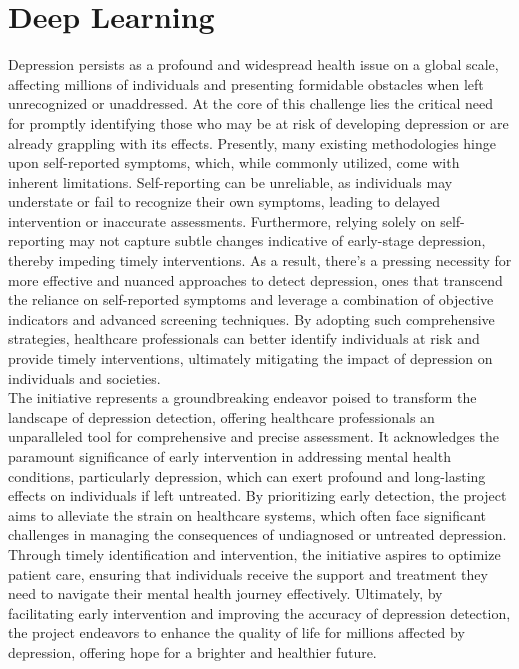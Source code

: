 \section{Deep Learning}
Depression persists as a profound and widespread health issue on a global scale, affecting millions of individuals and presenting formidable obstacles when left unrecognized or unaddressed. At the core of this challenge lies the critical need for promptly identifying those who may be at risk of developing depression or are already grappling with its effects. Presently, many existing methodologies hinge upon self-reported symptoms, which, while commonly utilized, come with inherent limitations. Self-reporting can be unreliable, as individuals may understate or fail to recognize their own symptoms, leading to delayed intervention or inaccurate assessments. Furthermore, relying solely on self-reporting may not capture subtle changes indicative of early-stage depression, thereby impeding timely interventions. As a result, there's a pressing necessity for more effective and nuanced approaches to detect depression, ones that transcend the reliance on self-reported symptoms and leverage a combination of objective indicators and advanced screening techniques. By adopting such comprehensive strategies, healthcare professionals can better identify individuals at risk and provide timely interventions, ultimately mitigating the impact of depression on individuals and societies.
\\
The initiative represents a groundbreaking endeavor poised to transform the landscape of depression detection, offering healthcare professionals an unparalleled tool for comprehensive and precise assessment. It acknowledges the paramount significance of early intervention in addressing mental health conditions, particularly depression, which can exert profound and long-lasting effects on individuals if left untreated. By prioritizing early detection, the project aims to alleviate the strain on healthcare systems, which often face significant challenges in managing the consequences of undiagnosed or untreated depression. Through timely identification and intervention, the initiative aspires to optimize patient care, ensuring that individuals receive the support and treatment they need to navigate their mental health journey effectively. Ultimately, by facilitating early intervention and improving the accuracy of depression detection, the project endeavors to enhance the quality of life for millions affected by depression, offering hope for a brighter and healthier future.
